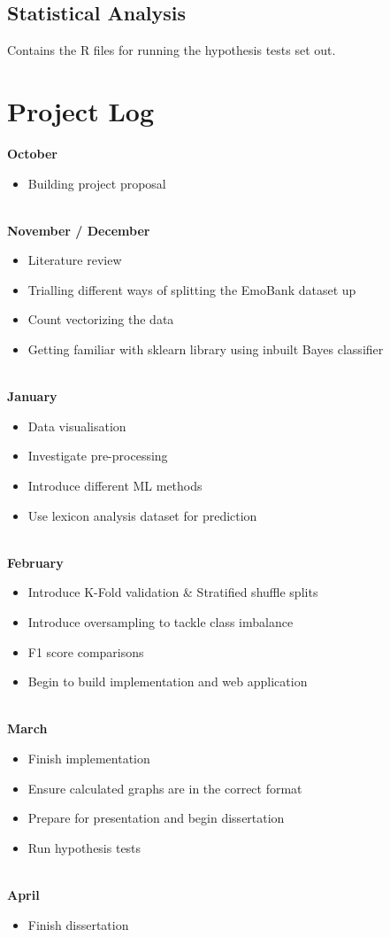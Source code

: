 \begin{appendices}
\subsection{Statistical Analysis}
Contains the R files for running the hypothesis tests set out.

\section{Project Log}

\textbf{October}
\begin{itemize}
    \item Building project proposal
\end{itemize}
\\
\textbf{November / December}
\begin{itemize}
    \item Literature review
    \item Trialling different ways of splitting the EmoBank dataset up
    \item Count vectorizing the data
    \item Getting familiar with sklearn library using inbuilt Bayes classifier
\end{itemize}
\\
\textbf{January}
\begin{itemize}
    \item Data visualisation
    \item Investigate pre-processing
    \item Introduce different ML methods
    \item Use lexicon analysis dataset for prediction
\end{itemize}
\\
\textbf{February}
\begin{itemize}
    \item Introduce K-Fold validation & Stratified shuffle splits
    \item Introduce oversampling to tackle class imbalance
    \item F1 score comparisons
    \item Begin to build implementation and web application
\end{itemize}
\\
\textbf{March}
\begin{itemize}
    \item Finish implementation
    \item Ensure calculated graphs are in the correct format
    \item Prepare for presentation and begin dissertation
    \item Run hypothesis tests
\end{itemize}
\\
\textbf{April}
\begin{itemize}
    \item Finish dissertation
\end{itemize}
\end{appendices}



